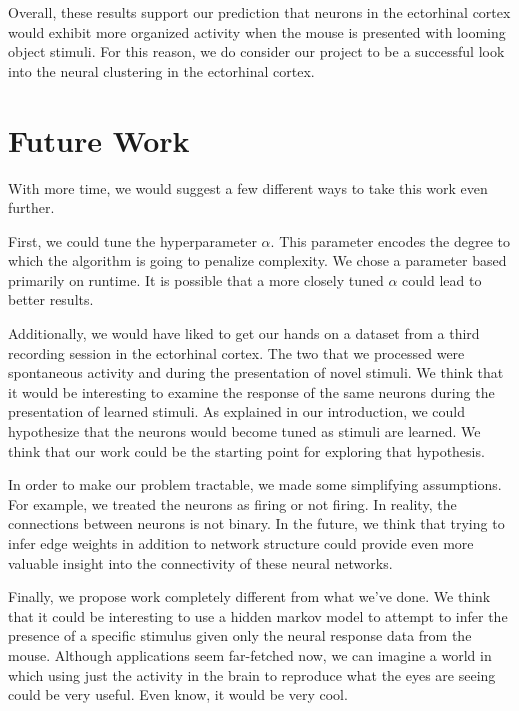 \documentclass{article}
\begin{document}
Overall, these results support our prediction that neurons in the ectorhinal 
cortex would exhibit more organized activity when the mouse is presented with 
looming object stimuli. For this reason, we do consider our project to be a 
successful look into the neural clustering in the ectorhinal cortex.\par


\section{Future Work}

With more time, we would suggest a few different ways to take this work even 
further.\par

First, we could tune the hyperparameter $\alpha$. This parameter encodes the 
degree to which the algorithm is going to penalize complexity. We chose a 
parameter based primarily on runtime. It is possible that a more closely tuned 
$\alpha$ could lead to better results. \par

Additionally, we would have liked to get our hands on a dataset from a third 
recording session in the ectorhinal cortex. The two that we processed were 
spontaneous activity and during the presentation of novel stimuli. We think 
that it would be interesting to examine the response of the same neurons 
during the presentation of learned stimuli. As explained in our introduction, 
we could hypothesize that the neurons would become tuned as stimuli are 
learned. We think that our work could be the starting point for exploring that 
hypothesis. \par

In order to make our problem tractable, we made some simplifying assumptions. 
For example, we treated the neurons as firing or not firing. In reality, the 
connections between neurons is not binary. In the future, we think that trying 
to infer edge weights in addition to network structure could provide even more 
valuable insight into the connectivity of these neural networks. \par

Finally, we propose work completely different from what we've done. We think 
that it could be interesting to use a hidden markov model to attempt to 
infer the presence of a specific stimulus given only the neural response 
data from the mouse. Although applications seem far-fetched now, we can 
imagine a world in which using just the activity in the brain to reproduce 
what the eyes are seeing could be very useful. Even know, it would be very 
cool. \par
\end{document}
